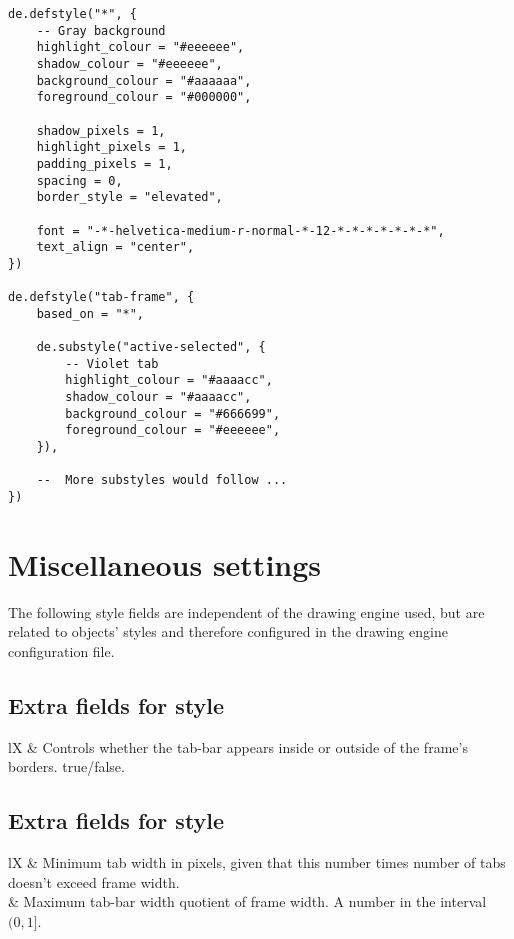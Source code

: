 \begin{verbatim}
de.defstyle("*", {
    -- Gray background
    highlight_colour = "#eeeeee",
    shadow_colour = "#eeeeee",
    background_colour = "#aaaaaa",
    foreground_colour = "#000000",
    
    shadow_pixels = 1,
    highlight_pixels = 1,
    padding_pixels = 1,
    spacing = 0,
    border_style = "elevated",
    
    font = "-*-helvetica-medium-r-normal-*-12-*-*-*-*-*-*-*",
    text_align = "center",
})

de.defstyle("tab-frame", {
    based_on = "*",
    
    de.substyle("active-selected", {
        -- Violet tab
        highlight_colour = "#aaaacc",
        shadow_colour = "#aaaacc",
        background_colour = "#666699",
        foreground_colour = "#eeeeee",
    }),

    --  More substyles would follow ...
})
\end{verbatim}


\section{Miscellaneous settings}

The following style fields are independent of the drawing engine used,
but are related to objects' styles and therefore configured in the drawing
engine configuration file.

\subsection{Extra fields for style }

\begin{tabularx}{\linewidth}{lX}
 & Controls whether the tab-bar
	appears inside or outside of the frame's borders. true/false.
\end{tabularx}

\subsection{Extra fields for style }
	
\begin{tabularx}{\linewidth}{lX}
 & Minimum tab width in pixels, given
	that this number times number of tabs doesn't exceed frame width. \\
 & Maximum tab-bar width quotient of
	frame width. A number in the interval $(0, 1]$.
\end{tabularx}	

